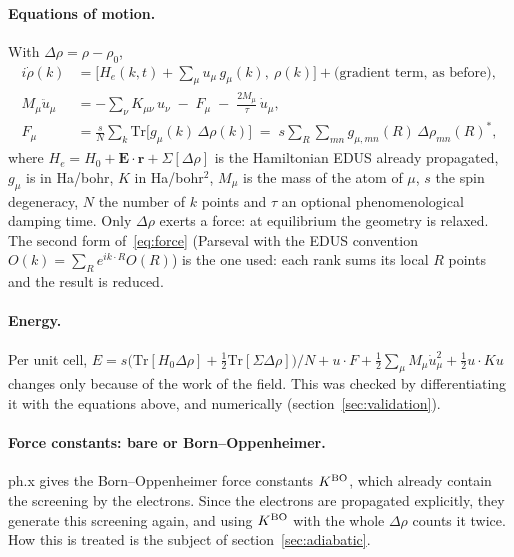 \documentclass[11pt]{article}
\newcommand{\Dr}{\Delta\rho}
\begin{document}
\paragraph{Equations of motion.} With $\Dr=\rho-\rho_0$,
\begin{align}
i\dot\rho(k) &= \Big[H_e(k,t) + \sum_\mu u_\mu\, g_\mu(k),\ \rho(k)\Big] + \text{(gradient term, as before)},\\
M_\mu \ddot u_\mu &= -\sum_\nu K_{\mu\nu}\,u_\nu \;-\; F_\mu \;-\; \frac{2M_\mu}{\tau}\,\dot u_\mu ,\\
F_\mu &= \frac{s}{N}\sum_k \mathrm{Tr}\big[g_\mu(k)\,\Dr(k)\big] \;=\; s\sum_R\sum_{mn} g_{\mu,mn}(R)\,\Dr_{mn}(R)^* ,
\label{eq:force}
\end{align}
where $H_e = H_0+\mathbf E\cdot\mathbf r+\Sigma[\Dr]$ is the Hamiltonian EDUS already propagated, $g_\mu$ is in Ha/bohr,
$K$ in Ha/bohr$^2$, $M_\mu$ is the mass of the atom of $\mu$, $s$ the spin degeneracy, $N$ the number of $k$ points and
$\tau$ an optional phenomenological damping time. Only $\Dr$ exerts a force: at equilibrium the geometry is relaxed. The
second form of~\eqref{eq:force} (Parseval with the EDUS convention $O(k)=\sum_R e^{ik\cdot R}O(R)$) is the one used:
each rank sums its local $R$ points and the result is reduced.

\paragraph{Energy.} Per unit cell, $E = s\big(\mathrm{Tr}[H_0\Dr]+\tfrac12\mathrm{Tr}[\Sigma\Dr]\big)/N + u\cdot F +
\tfrac12\sum_\mu M_\mu\dot u_\mu^2+\tfrac12 u\cdot K u$ changes only because of the work of the field. This was checked
by differentiating it with the equations above, and numerically (section~\ref{sec:validation}).

\paragraph{Force constants: bare or Born--Oppenheimer.} ph.x gives the Born--Oppenheimer force constants $K^{\rm BO}$,
which already contain the screening by the electrons. Since the electrons are propagated explicitly, they generate this
screening again, and using $K^{\rm BO}$ with the whole $\Dr$ counts it twice. How this is treated is the subject of
section~\ref{sec:adiabatic}.
\end{document}
